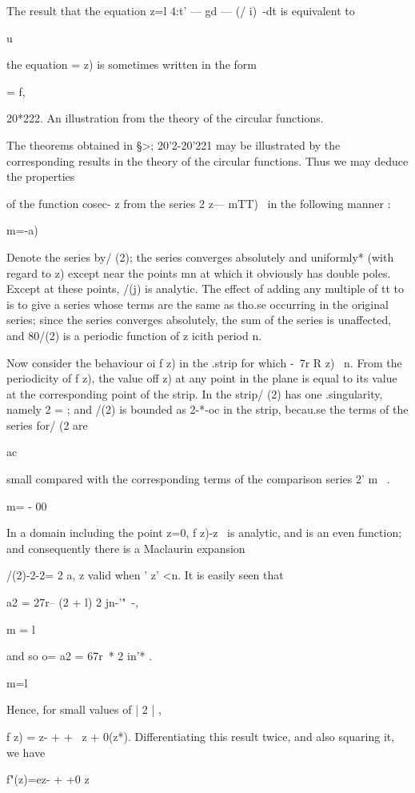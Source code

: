 {The result that the equation z=l 4:t' — gd — (/ i)~-dt is equivalent
to

u

the equation = z) is sometimes written in the form

= f,

20*222. An illustration from the theory of the circular functions.

The theorems obtained in §>; 20'2-20'221 may be illustrated by the
corresponding results in the theory of the circular functions. Thus we
may deduce the properties

of the function cosec- z from the series 2 z— mTT)~ in the following
manner :

m=-a)

Denote the series by/ (2); the series converges absolutely and
uniformly* (with regard to z) except near the points mn at which it
obviously has double poles. Except at these points, /(j) is analytic.
The effect of adding any multiple of tt to is to give a series whose
terms are the same as tho.se occurring in the original series; since
the series converges absolutely, the sum of the series is unaffected,
and 80/(2) is a periodic function of z icith period n.

Now consider the behaviour oi f z) in the .strip for which -\ 7r R z)
\ n. From the periodicity of f z), the value off z) at any point in
the plane is equal to its value at the corresponding point of the
strip. In the strip/ (2) has one .singularity, namely 2 = ; and /(2)
is bounded as 2-*-oc in the strip, becau.se the terms of the series
for/ (2 are

ac

small compared with the corresponding terms of the comparison series
2' m~ .

m= - 00

In a domain including the point z=0, f z)-z~ is analytic, and is an
even function; and consequently there is a Maclaurin expansion

/(2)-2-2= 2 a, z valid when ' z' <n. It is easily seen that

a2 = 27r-- (2 + l) 2 jn-'"~-,

m = l

and so o= a2 = 67r~* 2 in'* .

m=l

Hence, for small values of | 2 | ,

f z) = z- + + \ z + 0(z*). Differentiating this result twice, and also
squaring it, we have

f"(z)=ez- + +0 z%

}
